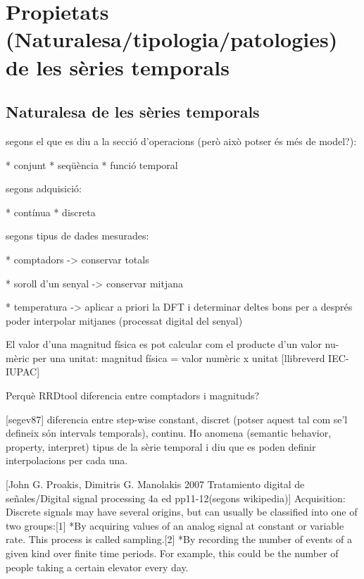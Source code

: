 \section{Propietats (Naturalesa/tipologia/patologies) de les sèries temporals}


\todo{}



\subsection{Naturalesa de les sèries temporals}

\todo{}


segons el que es diu a la secció d'operacions (però això potser és més de model?):

* conjunt
* seqüència
* funció temporal

segons adquisició:

* contínua
* discreta


segons tipus de dades mesurades:

* comptadors -> conservar totals

* soroll d'un senyal -> conservar mitjana

* temperatura -> aplicar a priori la DFT i determinar deltes bons per a després poder interpolar mitjanes (processat digital del senyal)


El valor d’una magnitud física es pot calcular com el producte d’un valor nu-
mèric per una unitat:
magnitud física = valor numèric x unitat [llibreverd IEC-IUPAC]



Perquè RRDtool diferencia entre comptadors i magnituds?

[segev87] diferencia entre step-wise constant, discret (potser aquest tal com se'l defineix són intervals temporals), continu. Ho anomena (semantic behavior, property, interpret)
 tipus de la sèrie temporal i diu que es poden definir interpolacions per cada una.




[John G. Proakis, Dimitris G. Manolakis 2007 Tratamiento digital de señales/Digital signal processing 4a ed pp11-12(segons wikipedia)] Acquisition: Discrete signals may have several origins, but can usually be classified into one of two groups:[1]
*By acquiring values of an analog signal at constant or variable rate. This process is called sampling.[2]
*By recording the number of events of a given kind over finite time periods. For example, this could be the number of people taking a certain elevator every day.










